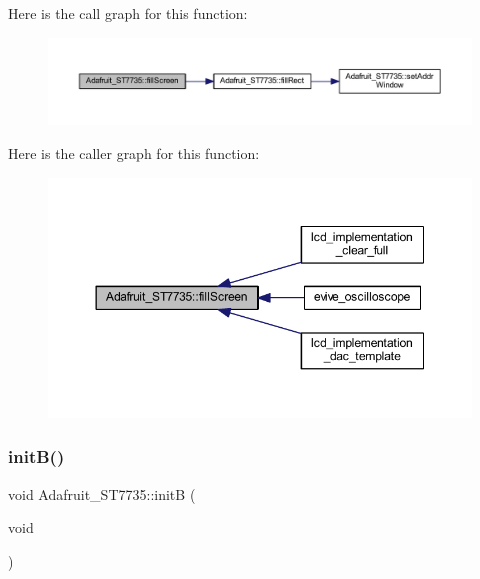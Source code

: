 Here is the call graph for this function\+:
\nopagebreak
\begin{figure}[H]
\begin{center}
\leavevmode
\includegraphics[width=350pt]{dd/dee/class_adafruit___s_t7735_af732d3d78239687718bb117de99418ca_cgraph}
\end{center}
\end{figure}
Here is the caller graph for this function\+:
\nopagebreak
\begin{figure}[H]
\begin{center}
\leavevmode
\includegraphics[width=350pt]{dd/dee/class_adafruit___s_t7735_af732d3d78239687718bb117de99418ca_icgraph}
\end{center}
\end{figure}
\mbox{\label{class_adafruit___s_t7735_a71d8744ce7a27cd978ec64616d2ddae4}} 
\subsubsection{\texorpdfstring{init\+B()}{initB()}}
{\footnotesize\ttfamily void Adafruit\+\_\+\+S\+T7735\+::initB (\begin{DoxyParamCaption}\item[{void}]{ }\end{DoxyParamCaption})}

\mbox{\label{class_adafruit___s_t7735_a416b7a2b4748a90f8a33028522fa7504}} 
